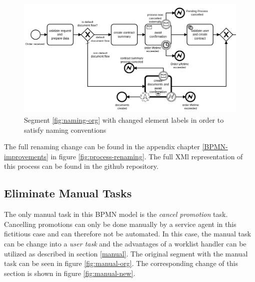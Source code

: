 \begin{figure}[H]
	\centering
	\includegraphics[width=0.9\columnwidth]{graphics/case-study-naming-new}
	\caption{Segment \ref{fig:naming-org} with changed element labels in order to satisfy naming conventions}
	\label{fig:naming-new}
\end{figure}

The full renaming change can be found in the appendix chapter \ref{BPMN-improvements} in figure \ref{fig:process-renaming}. The full XMl representation of this process can be found in the github repository\cite{appendix-registration-2}.

\subsection{Eliminate Manual Tasks}
The only manual task in this BPMN model is the \textit{cancel promotion} task. Cancelling promotions can only be done manually by a service agent in this fictitious case and can therefore not be automated. In this case, the manual task can be change into a \textit{user task} and the advantages of a worklist handler can be utilized as described in section \ref{manual}.
The original segment with the manual task can be seen in figure \ref{fig:manual-org}. The corresponding change of this section is shown in figure \ref{fig:manual-new}. 


